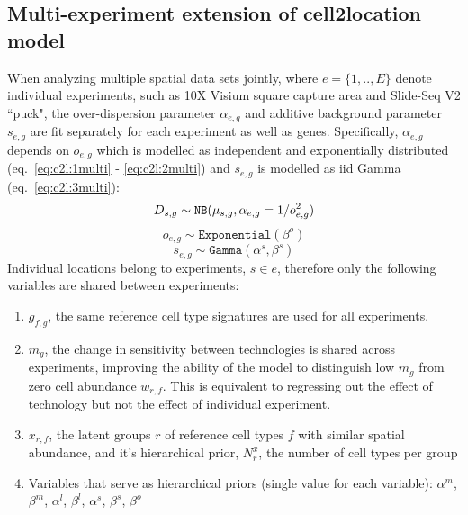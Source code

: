 \documentclass[11pt,a4paper]{article}
\begin{document}
\subsection{Multi-experiment extension of cell2location model} \label{c2l_multi}

When analyzing multiple spatial data sets jointly, where $e=\{1,..,E\}$ denote individual experiments, such as 10X Visium square capture area and Slide-Seq V2 ``puck", the over-dispersion parameter $\alpha_{e,g}$ and additive background parameter $s_{e,g}$ are fit separately for each experiment as well as genes. Specifically, $\alpha_{e,g}$ depends on $o_{e,g}$ which is modelled as independent and exponentially distributed (eq.~\eqref{eq:c2l:1multi} - \eqref{eq:c2l:2multi}) and $s_{e,g}$ is modelled as iid Gamma (eq.~\eqref{eq:c2l:3multi}):
    \begin{equation} \label{eq:c2l:1multi}
    D_{s,g} \sim \mathtt{NB}(\mu_{s,g}, \alpha_{e,g} = 1 / o_{e,g} ^ 2) \\
    \end{equation}
    \begin{equation} \label{eq:c2l:2multi}
    o_{e,g} \sim \mathtt{Exponential}(\beta^o)
    \end{equation}
    \begin{equation} \label{eq:c2l:3multi}
    s_{e,g} \sim \mathtt{Gamma}(\alpha^s,  \beta^s)
    \end{equation}
Individual locations belong to experiments, $s \in e$, therefore only the following variables are shared between experiments:
\begin{enumerate}

    \item $g_{f,g}$, the same reference cell type signatures are used for all experiments.
    
    \item $m_{g}$, the change in sensitivity between technologies is shared across experiments, improving the ability of the model to distinguish low $m_{g}$ from zero cell abundance $w_{r,f}$. This is equivalent to regressing out the effect of technology but not the effect of individual experiment. 
    
    \item $x_{r,f}$, the latent groups $r$ of reference cell types $f$ with similar spatial abundance, and it's hierarchical prior, $N_r^{x}$, the number of cell types per group
    
    \item Variables that serve as hierarchical priors (single value for each variable): $\alpha^m$, $\beta^m$, $\alpha^l$, $\beta^l$, $\alpha^s$, $\beta^s$, $\beta^o$
    
\end{enumerate}
\end{document}
